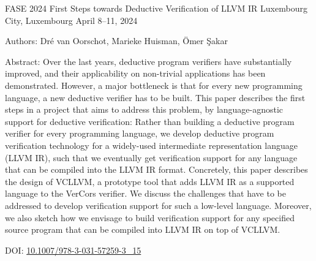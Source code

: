 \begin{cventries}
		\cventry
	{FASE 2024} %
	{First Steps towards Deductive Verification of LLVM IR} %
	{Luxembourg City, Luxembourg} %
	{April 8–11, 2024} %
	{
		\begin{cvitems} %
			\item Authors: Dré van Oorschot, Marieke Huisman, \"Omer \c{S}akar
			\item Abstract: Over the last years, deductive program verifiers have substantially improved, and their applicability on non-trivial applications has been demonstrated. However, a major bottleneck is that for every new programming language, a new deductive verifier has to be built. This paper describes the first steps in a project that aims to address this problem, by language-agnostic support for deductive verification: Rather than building a deductive program verifier for every programming language, we develop deductive program verification technology for a widely-used intermediate representation language (LLVM IR), such that we eventually get verification support for any language that can be compiled into the LLVM IR format. Concretely, this paper describes the design of VCLLVM, a prototype tool that adds LLVM IR as a supported language to the VerCors verifier. We discuss the challenges that have to be addressed to develop verification support for such a low-level language. Moreover, we also sketch how we envisage to build verification support for any specified source program that can be compiled into LLVM IR on top of VCLLVM.
			\item DOI: \href{https://doi.org/10.1007/978-3-031-57259-3_15}{10.1007/978-3-031-57259-3\_15}
		\end{cvitems}
	}
	

\end{cventries}
